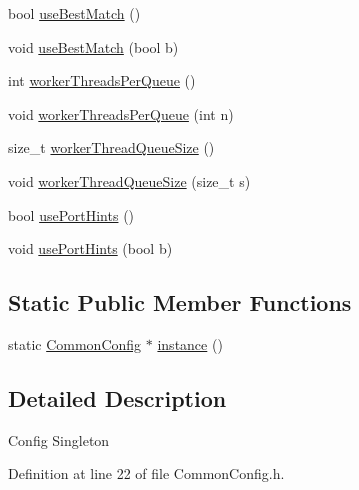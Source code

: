 \begin{DoxyCompactItemize}
\item 
bool \hyperlink{class_vsid_common_1_1_common_config_a459340bb4e0af6a87ab79a50f0467776}{use\-Best\-Match} ()
\item 
void \hyperlink{class_vsid_common_1_1_common_config_a4abc81554d9dc316a8c87b245a5ed27e}{use\-Best\-Match} (bool b)
\item 
int \hyperlink{class_vsid_common_1_1_common_config_a7ef125a1ecf4a659355d83c2531a49e9}{worker\-Threads\-Per\-Queue} ()
\item 
void \hyperlink{class_vsid_common_1_1_common_config_ade8cb2878144d9f6a887539c3bb8128c}{worker\-Threads\-Per\-Queue} (int n)
\item 
size\-\_\-t \hyperlink{class_vsid_common_1_1_common_config_a2f4bee732b0568e4d2a0e1567bdf5351}{worker\-Thread\-Queue\-Size} ()
\item 
void \hyperlink{class_vsid_common_1_1_common_config_a40dec6d04400dc51fb819612370c3200}{worker\-Thread\-Queue\-Size} (size\-\_\-t s)
\item 
bool \hyperlink{class_vsid_common_1_1_common_config_a3fe2873055cffb669806f6f9e5edb2a7}{use\-Port\-Hints} ()
\item 
void \hyperlink{class_vsid_common_1_1_common_config_a52615cac73bb4bdeb420492bce8f2521}{use\-Port\-Hints} (bool b)
\end{DoxyCompactItemize}
\subsection*{Static Public Member Functions}
\begin{DoxyCompactItemize}
\item 
static \hyperlink{class_vsid_common_1_1_common_config}{Common\-Config} $\ast$ \hyperlink{class_vsid_common_1_1_common_config_a69c29458a786be527fe66470ac9fbbdb}{instance} ()
\end{DoxyCompactItemize}


\subsection{Detailed Description}
Config Singleton 

Definition at line 22 of file Common\-Config.\-h.



